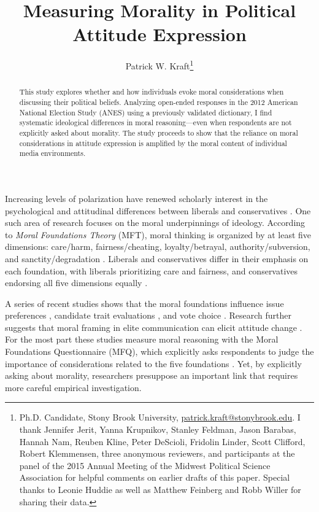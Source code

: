 \documentclass[12pt]{article}
\author{Patrick W. Kraft\footnote{Ph.D. Candidate, Stony Brook University, \href{mailto:patrick.kraft@stonybrook.edu}{patrick.kraft@stonybrook.edu}.
I thank Jennifer Jerit, Yanna Krupnikov, Stanley Feldman, Jason Barabas, Hannah Nam, Reuben Kline, Peter DeScioli, Fridolin Linder, Scott Clifford, 
Robert Klemmensen,  %
three anonymous reviewers, and participants at the panel of the 2015 Annual Meeting of the Midwest Political Science Association for helpful comments on earlier drafts of this paper. Special thanks to Leonie Huddie as well as Matthew Feinberg and Robb Willer for sharing their data.
}}
\date{}
\title{Measuring Morality in Political Attitude Expression
}
\begin{document}
\maketitle
\doublespacing
\thispagestyle{empty}

\begin{abstract}
This study explores whether and how individuals evoke moral considerations when discussing their political beliefs. Analyzing open-ended responses in the 2012 American National Election Study (ANES) using a previously validated dictionary, I find systematic ideological differences in moral reasoning---even when respondents are not explicitly asked about morality. The study proceeds to show that the reliance on moral considerations in attitude expression is amplified by the moral content of individual media environments.

\end{abstract}
\newpage
\setcounter{page}{1}

Increasing levels of polarization have renewed scholarly interest in the psychological and attitudinal differences between liberals and conservatives \citep{jost2006end}. One such area of research focuses on the moral underpinnings of ideology. According to \textit{Moral Foundations Theory} (MFT), moral thinking is organized by at least five dimensions: care/harm, fairness/cheating, loyalty/betrayal, authority/subversion, and sanctity/degradation \citep{graham2013moral}. Liberals and conservatives differ in their emphasis on each foundation, with liberals prioritizing care and fairness, and conservatives endorsing all five dimensions equally \citep{graham2009liberals}.


A series of recent studies shows that the moral foundations influence issue preferences \citep{kertzer2014moral}, candidate trait evaluations \citep{clifford2014linking}, and vote choice \citep{iyer2010beyond}. Research further suggests that moral framing in elite communication can elicit attitude change \citep[e.g.][]{clifford2015concerns,feinberg2013moral}. For the most part these studies measure moral reasoning with the Moral Foundations Questionnaire (MFQ), which explicitly asks respondents to judge the importance of considerations related to the five foundations \citep[e.g.,][]{graham2011mapping}. Yet, by explicitly asking about morality, researchers presuppose an important link that requires more careful empirical investigation.
\end{document}
